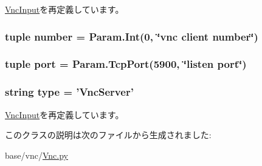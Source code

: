 \hyperlink{classVnc_1_1VncInput_a17da7064bc5c518791f0c891eff05fda}{VncInput}を再定義しています。\hypertarget{classVnc_1_1VncServer_a629b7ca94b6a486bdc504ed959b90cc8}{
\subsubsection[{number}]{\setlength{\rightskip}{0pt plus 5cm}tuple {\bf number} = Param.Int(0, \char`\"{}vnc client {\bf number}\char`\"{})}}
\label{classVnc_1_1VncServer_a629b7ca94b6a486bdc504ed959b90cc8}
\hypertarget{classVnc_1_1VncServer_a1aadf525515ecfcf662c2aa51a503763}{
\subsubsection[{port}]{\setlength{\rightskip}{0pt plus 5cm}tuple {\bf port} = Param.TcpPort(5900, \char`\"{}listen {\bf port}\char`\"{})}}
\label{classVnc_1_1VncServer_a1aadf525515ecfcf662c2aa51a503763}
\hypertarget{classVnc_1_1VncServer_acce15679d830831b0bbe8ebc2a60b2ca}{
\subsubsection[{type}]{\setlength{\rightskip}{0pt plus 5cm}string {\bf type} = '{\bf VncServer}'}}
\label{classVnc_1_1VncServer_acce15679d830831b0bbe8ebc2a60b2ca}


\hyperlink{classVnc_1_1VncInput_acce15679d830831b0bbe8ebc2a60b2ca}{VncInput}を再定義しています。

このクラスの説明は次のファイルから生成されました:\begin{DoxyCompactItemize}
\item 
base/vnc/\hyperlink{Vnc_8py}{Vnc.py}\end{DoxyCompactItemize}
